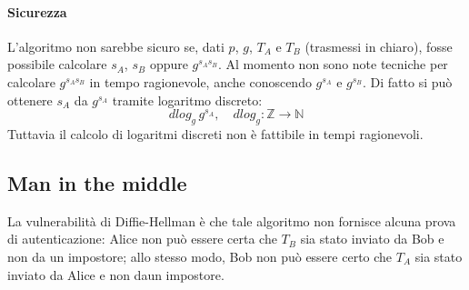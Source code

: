 \paragraph{Sicurezza}
L'algoritmo non sarebbe sicuro se, dati $p$, $g$, $T_{A}$ e $T_{B}$ (trasmessi in chiaro), fosse possibile calcolare $s_{A}$, $s_{B}$ oppure $g^{s_{A}s_{B}}$. Al momento non sono note tecniche per calcolare $g^{s_{A}s_{B}}$ in tempo ragionevole, anche conoscendo $g^{s_{A}}$ e $g^{s_{B}}$. Di fatto si può ottenere $s_{A}$ da $g^{s_{A}}$ tramite logaritmo discreto:
\begin{equation}
dlog_{g} \, g^{s_{A}}, \quad dlog_{g}: \mathbb{Z} \rightarrow \mathbb{N}
\end{equation} 
Tuttavia il calcolo di logaritmi discreti non è fattibile in tempi ragionevoli.
\subsection{Man in the middle}
La vulnerabilità di Diffie-Hellman è che tale algoritmo non fornisce alcuna prova di autenticazione: Alice non può essere certa che $T_{B}$ sia stato inviato da Bob e non da un impostore; allo stesso modo, Bob non può essere certo che $T_{A}$ sia stato inviato da Alice e non daun impostore. 

